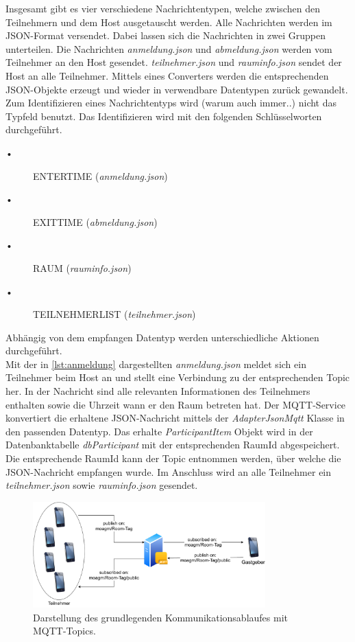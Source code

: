 Insgesamt gibt es vier verschiedene Nachrichtentypen, welche zwischen den Teilnehmern und dem Host ausgetauscht werden. Alle Nachrichten werden im JSON-Format versendet. Dabei lassen sich die Nachrichten in zwei Gruppen unterteilen. Die Nachrichten \textit{anmeldung.json} und \textit{abmeldung.json} werden vom Teilnehmer an den Host gesendet. \textit{teilnehmer.json} und \textit{rauminfo.json} sendet der Host an alle Teilnehmer. Mittels eines Converters werden die entsprechenden JSON-Objekte erzeugt und wieder in verwendbare Datentypen zurück gewandelt. Zum Identifizieren eines Nachrichtentyps wird (warum auch immer..) nicht das Typfeld benutzt. 
Das Identifizieren wird mit den folgenden Schlüsselworten durchgeführt.
\begin{description}
\item[•] ENTERTIME (\textit{anmeldung.json})
\item[•] EXITTIME (\textit{abmeldung.json})
\item[•] RAUM (\textit{rauminfo.json})
\item[•] TEILNEHMERLIST (\textit{teilnehmer.json})
\end{description}
Abhängig von dem empfangen Datentyp werden unterschiedliche Aktionen durchgeführt.
\\
Mit der in \cref{lst:anmeldung} dargestellten \textit{anmeldung.json} meldet sich ein Teilnehmer beim Host an und stellt eine Verbindung zu der entsprechenden Topic her. In der Nachricht sind alle relevanten Informationen des Teilnehmers enthalten sowie die Uhrzeit wann er den Raum betreten hat. Der MQTT-Service konvertiert die erhaltene JSON-Nachricht mittels der \textit{AdapterJsonMqtt} Klasse in den passenden Datentyp. Das erhalte \textit{ParticipantItem} Objekt wird in der Datenbanktabelle \textit{dbParticipant} mit der  entsprechenden RaumId abgespeichert. Die entsprechende RaumId kann der Topic entnommen werden, über welche die JSON-Nachricht empfangen wurde. Im Anschluss wird an alle Teilnehmer ein \textit{teilnehmer.json} sowie \textit{rauminfo.json} gesendet.
\begin{figure}
	\centering
	\includegraphics[width =0.8\textwidth]{images/mqttservice.pdf}
	\caption{Darstellung des grundlegenden Kommunikationsablaufes mit MQTT-Topics.}
	\label{img:mqtt}
\end{figure}
